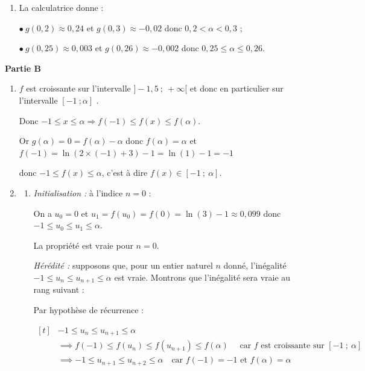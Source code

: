 \begin{enumerate}
\begin{enumerate}
En vertu du corollaire au théorème des valeurs intermédiaires appliqué aux fonctions strictement monotones, l'équation $g(x)=0$ admet une unique solution sur l'intervalle $]-0,5~;~+\infty[$.
	\item La calculatrice donne :
	
$\bullet~$$g(0,2) \approx 0,24$ et $g(0,3) \approx - 0,02$ donc $0,2 < \alpha < 0,3$ ;
	
$\bullet~$$g(0,25) \approx 0,003$ et $g(0,26) \approx - 0,002$ donc $0,25\leqslant\alpha \leqslant 0,26$.
	\end{enumerate}
\end{enumerate}

\bigskip

\textbf{Partie B}

\medskip

\begin{enumerate}
\item $f$ est  croissante sur l'intervalle  $ ]-1,5~;~+\infty[ $  et donc en particulier sur l'intervalle $[-1~; \alpha]$ .

Donc $-1 \leqslant x \leqslant \alpha \Longrightarrow f(-1) \leqslant f(x) \leqslant f(\alpha)$.

Or $g(\alpha ) = 0 = f(\alpha) -\alpha$ donc $ f(\alpha)=\alpha$ et $f(-1) = \ln(2\times(-1)+3)-1= \ln(1) - 1 =- 1$

donc $- 1 \leqslant f(x) \leqslant\alpha $, c'est à dire $f(x) \in [-1~;~\alpha]$.
\item
	\begin{enumerate}
		\item
\emph{Initialisation :} à l'indice $n=0$ :
			
On a  $u_0=0$ et $u_1=f(u_0)=f(0)=\ln(3)-1\approx 0,099$  donc $-1 \leqslant u_0 \leqslant u_1 \leqslant\alpha$.

La propriété est vraie pour $n=0$.

\emph{Hérédité :} supposons que, pour un entier naturel $n$ donné, l'inégalité  $-1 \leqslant u_n \leqslant u_{n+1} \leqslant\alpha$ est vraie. Montrons que l'inégalité sera vraie au rang suivant :

Par hypothèse de récurrence : 

$\begin{aligned}[t]  & -1 \leqslant u_n \leqslant u_{n+1} \leqslant\alpha \\
	&\implies f(-1) \leqslant f(u_n) \leqslant f(u_{n+1}) \leqslant f(\alpha) \quad \text{ car } f \text{ est croissante sur  } [-1~;~\alpha]\\
	&\implies -1\leqslant u_{n+1}\leqslant u_{n+2} \leqslant\alpha  \quad \text{car } f(-1)=-1 \text{ et } f(\alpha)=\alpha\\ \end{aligned}$


\end{enumerate}
\end{enumerate}
